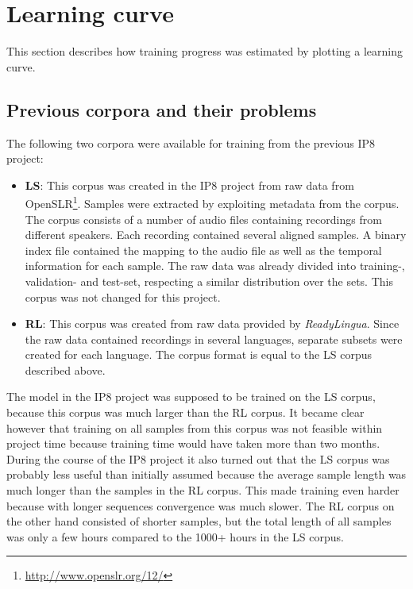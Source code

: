 \section{Learning curve}

This section describes how training progress was estimated by plotting a learning curve.

\subsection{Previous corpora and their problems}

The following two corpora were available for training from the previous IP8 project:

\begin{itemize}
	\item \textbf{\ac{LS}}: This corpus was created in the IP8 project from raw data from OpenSLR\footnote{\url{http://www.openslr.org/12/}}. Samples were extracted by exploiting metadata from the corpus. The corpus consists of a number of audio files containing  recordings from different speakers. Each recording contained several aligned samples. A binary index file contained the mapping to the audio file as well as the temporal information for each sample. The raw data was already divided into training-, validation- and test-set, respecting a similar distribution over the sets. This corpus was not changed for this project.
	\item \textbf{\ac{RL}}: This corpus was created from raw data provided by \textit{ReadyLingua}. Since the raw data contained recordings in several languages, separate subsets were created for each language. The corpus format is equal to the \ac{LS} corpus described above.
\end{itemize}

The model in the IP8 project was supposed to be trained on the \ac{LS} corpus, because this corpus was much larger than the \ac{RL} corpus. It became clear however that training on all samples from this corpus was not feasible within project time because training time would have taken more than two months. During the course of the IP8 project it also turned out that the \ac{LS} corpus was probably less useful than initially assumed because the average sample length was much longer than the samples in the \ac{RL} corpus. This made training even harder because with longer sequences convergence was much slower. The \ac{RL} corpus on the other hand consisted of shorter samples, but the total length of all samples was only a few hours compared to the 1000+ hours in the \ac{LS} corpus.

